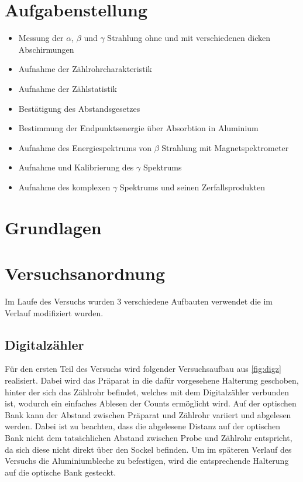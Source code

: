 \documentclass[12pt,english,ngerman]{scrartcl}
\begin{document}
%
\tableofcontents
\newpage

\section{Aufgabenstellung\label{Auf}}



\begin{itemize}
    \item Messung der $\alpha$, $\beta$ und $\gamma$ Strahlung ohne und mit verschiedenen dicken Abschirmungen
    \item Aufnahme der Zählrohrcharakteristik
    \item Aufnahme der Zählstatistik
    \item Bestätigung des Abstandsgesetzes
    \item Bestimmung der Endpunktsenergie über Absorbtion in Aluminium
    \item Aufnahme des Energiespektrums von $\beta$ Strahlung mit Magnetspektrometer
    \item Aufnahme und Kalibrierung des $\gamma$ Spektrums
    \item Aufnahme des komplexen $\gamma$ Spektrums und seinen Zerfallsprodukten
\end{itemize}

\section{Grundlagen}\label{Grund}


\section{Versuchsanordnung}\label{sec:Versuchsanordnung}

Im Laufe des Versuchs wurden 3 verschiedene Aufbauten verwendet die im Verlauf modifiziert wurden.

\subsection{Digitalzähler}\label{aufbau_Digz}

Für den ersten Teil des Versuchs wird folgender Versuchsaufbau aus \autoref{fig:digz} realisiert.
Dabei wird das Präparat in die dafür vorgesehene Halterung geschoben, hinter der sich das Zählrohr befindet, 
welches mit dem Digitalzähler verbunden ist, wodurch ein einfaches Ablesen der Counts ermöglicht wird.
Auf der optischen Bank kann der Abstand zwischen Präparat und Zählrohr variiert und abgelesen werden.
Dabei ist zu beachten, dass die abgelesene Distanz auf der optischen Bank nicht dem tatsächlichen Abstand zwischen 
Probe und Zählrohr entspricht, da sich diese nicht direkt über den Sockel befinden. Um im späteren Verlauf des Versuchs die 
Aluminiumbleche zu befestigen, wird die entsprechende Halterung auf die optische Bank gesteckt.
\end{document}
